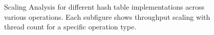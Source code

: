 \begin{figure}[p]
\begin{subfigure}[b]{0.48\textwidth}
        \caption{}
    \end{subfigure}

    \caption{Scaling Analysis for different hash table implementations across various operations. Each subfigure shows throughput scaling with thread count for a specific operation type.}
    \label{fig:scaling_analysis}
\end{figure}